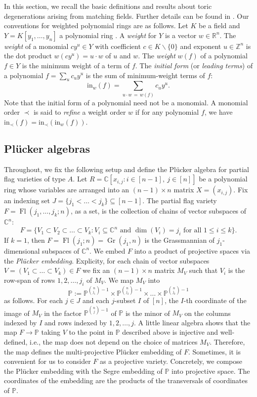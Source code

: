 \documentclass[11pt]{article}
\newcommand{\CC}{\mathbb C}
\newcommand{\PP}{\mathbb P}
\newcommand{\RR}{\mathbb R}
\newcommand{\ZZ}{\mathbb Z}
\newcommand{\init}{\text{in}}
\DeclareMathOperator{\Fl}{Fl}
\DeclareMathOperator{\Gr}{Gr}
\theoremstyle{plain}
\theoremstyle{definition}
\theoremstyle{remark}
\begin{document}
In this section, we recall the basic definitions and results about toric degenerations arising from matching fields. Further details can be found in \cite{clarke2022partial}. Our conventions for weighted polynomial rings are as follows. Let $K$ be a field and $Y = K[y_1, \dots, y_n]$ a polynomial ring . A \textit{weight} for $Y$ is a vector $w \in \RR^{n}$. The \textit{weight} of a monomial $cy^u \in Y$ with coefficient $c \in K \backslash \{0\}$ and exponent $u \in \ZZ^n$ is the dot product $w(c y^u) = u \cdot w$ of $u$ and $w$. The \textit{weight} $w(f)$ of a polynomial $f \in Y$ is the minimum weight of a term of $f$. The \textit{initial form} (or \textit{leading terms}) of a polynomial $f = \sum_u c_u y^u$ is the sum of minimum-weight terms of $f$:
\[
\init_w(f) = \sum_{u \cdot w \, = \, w(f)} c_u y^u.
\]
Note that the initial form of a polynomial need not be a monomial. A monomial order $\prec$ is said to \textit{refine} a weight order $w$ if for any polynomial $f$, we have $\init_\prec(f) = \init_\prec(\init_w(f))$.

\subsection{Pl\"ucker algebras}\label{sec: bg plucker}

Throughout, we fix the following setup and define the Pl\"ucker algebra for partial flag varieties of type $A$. Let $R = \CC[x_{i,j} \colon i \in [n-1], \ j \in [n]]$ be a polynomial ring whose variables are arranged into an $(n-1) \times n$ matrix $X = (x_{i,j})$.
Fix an indexing set $J = \{j_1 < \dots < j_k \} \subseteq [n-1]$. 
The partial flag variety $F = \Fl(j_1, \dots, j_k; n)$, as a set, is the collection of chains of vector subspaces of $\CC^n$:
\[
F = 
\{V_1 \subset V_2 \subset \dots \subset V_k \colon V_i \subseteq \CC^n \text{ and } \dim(V_i) = j_i \text{ for all } 1 \le i \le k\}.
\]
If $k = 1$, then $F = \Fl(j_1; n) = \Gr(j_1, n)$ is the Grassmannian of $j_1$-dimensional subspaces of $\CC^n$.
We embed $F$ into a product of projective spaces via the \textit{Pl\"ucker embedding}. 
Explicity, for each chain of vector subspaces $V = (V_1 \subset \dots \subset V_k) \in F$ we fix an $(n-1) \times n$ matrix $M_V$ such that $V_i$ is the row-span of rows $1,2, \dots, j_i$ of $M_V$. We map $M_V$ into
\[
\PP := \PP^{\binom{n}{j_1} - 1} \times \PP^{\binom{n}{j_2} - 1} \times \dots \times \PP^{\binom{n}{j_k} - 1}
\]
as follows. For each $j \in J$ and each $j$-subset $I$ of $[n]$, the $I$-th coordinate of the image of $M_V$ in the factor $\PP^{\binom{n}{j} - 1}$ of $\PP$ is the minor of $M_V$ on the columns indexed by $I$ and rows indexed by $1, 2, \dots, j$. A little linear algebra shows that the map $F \rightarrow \PP$ taking $V$ to the point in $\PP$ described above is  injective and well-defined, i.e., the map does not depend on the choice of matrices $M_V$. Therefore, the map defines the multi-projective Pl\"ucker embedding of $F$. Sometimes, it is convenient for us to consider $F$ as a projective variety. Concretely, we compose the Pl\"ucker embedding with the Segre embedding of $\PP$ into projective space. The coordinates of the embedding are the products of the transversals of coordinates of $\PP$.
\end{document}
